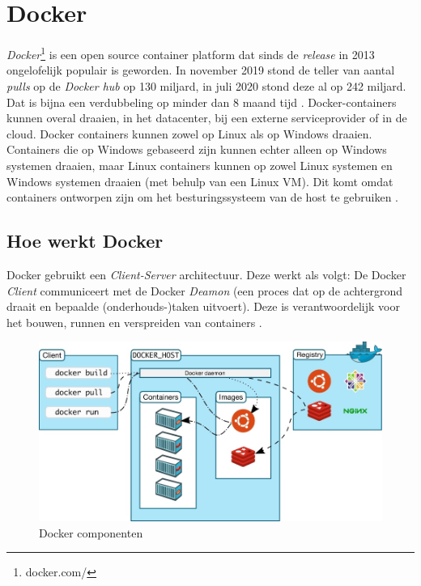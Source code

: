 \section{Docker}
\textit{Docker}\footnote{docker.com/} is een open source container platform dat sinds de \textit{release} in 2013 ongelofelijk populair is geworden. In november 2019 stond de teller van aantal \textit{pulls} op de \textit{Docker hub} op 130 miljard, in juli 2020 stond deze al op 242 miljard. Dat is bijna een verdubbeling op minder dan 8 maand tijd \autocite{Kreisa2020}. Docker-containers kunnen overal draaien, in het datacenter, bij een externe serviceprovider of in de cloud. Docker containers kunnen zowel op Linux als op Windows draaien. Containers die op Windows gebaseerd zijn kunnen echter alleen op Windows systemen draaien, maar Linux containers kunnen op zowel Linux systemen en Windows systemen draaien (met behulp van een Linux VM). Dit komt omdat containers ontworpen zijn om het besturingssysteem van de host te gebruiken \autocite{Anil2018}.


\subsection{Hoe werkt Docker}
Docker gebruikt een \textit{Client-Server} architectuur. Deze werkt als volgt: De Docker \textit{Client} communiceert met de Docker \textit{Deamon} (een proces dat op de achtergrond draait en bepaalde (onderhouds-)taken uitvoert). Deze is verantwoordelijk voor het bouwen, runnen en verspreiden van containers \autocite{Docker2021a}.

\begin{figure}[ht]
	\centering
	\includegraphics[width=\linewidth]{img/dockerArchitecture.jpg}
	\caption{Docker componenten \autocite{Docker2021a}}
	\label{fig:dockerArch}
\end{figure}

